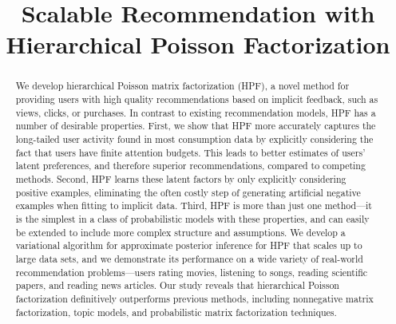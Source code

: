 \documentclass[]{article}
\title{Scalable Recommendation with Hierarchical Poisson Factorization}
\author{} %
\begin{document}
\maketitle

\begin{abstract}
We develop hierarchical Poisson matrix factorization (HPF), a novel
method for providing users with high quality recommendations based on
implicit feedback, such as views, clicks, or purchases.  In contrast
to existing recommendation models, HPF has a number of desirable
properties.  First, we show that HPF more accurately captures the
long-tailed user activity found in most consumption data by explicitly
considering the fact that users have finite attention budgets.  This
leads to better estimates of users' latent preferences, and therefore
superior recommendations, compared to competing methods.  Second, HPF
learns these latent factors by only explicitly considering positive
examples, eliminating the often costly step of generating artificial
negative examples when fitting to implicit data.  Third, HPF is more
than just one method---it is the simplest in a class of probabilistic
models with these properties, and can easily be extended to include
more complex structure and assumptions.  We develop a variational
algorithm for approximate posterior inference for HPF that scales up
to large data sets, and we demonstrate its performance on a wide
variety of real-world recommendation problems---users rating movies,
listening to songs, reading scientific papers, and reading news
articles.  Our study reveals that hierarchical Poisson factorization
definitively outperforms previous methods, including nonnegative
matrix factorization, topic models, and probabilistic matrix
factorization techniques.
\end{abstract}








\small{
  
  
}

\newpage
\appendix

\end{document}
